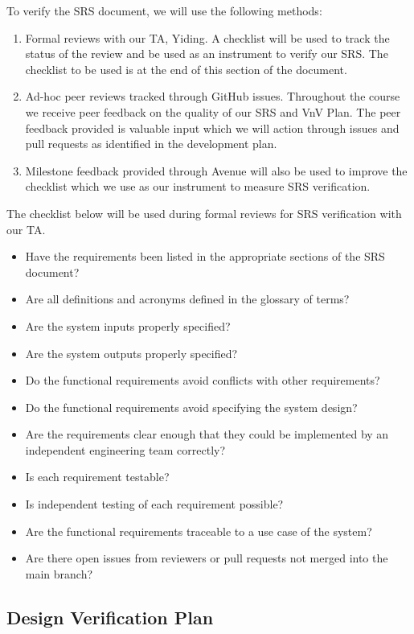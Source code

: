 \documentclass[12pt, titlepage]{article}
\begin{document}
To verify the SRS document, we will use the following methods:
\begin{enumerate}
  \item Formal reviews with our TA, Yiding. A checklist will be used to track
    the status of the review and be used as an instrument to verify our SRS.
    The checklist to be used is at the end of this section of the document.
  \item Ad-hoc peer reviews tracked through GitHub issues. Throughout the
    course we receive peer feedback on the quality of our SRS and VnV Plan. The
    peer feedback provided is valuable input which we will action through issues
    and pull requests as identified in the development plan.
  \item Milestone feedback provided through Avenue will also be used to
    improve the checklist which we use as our instrument to measure
    SRS verification.
\end{enumerate}
The checklist below will be used during formal reviews for SRS verification
with our TA.
\begin{itemize}
\item Have the requirements been listed in the appropriate sections of the
  SRS document?
\item Are all definitions and acronyms defined in the glossary of terms?
\item Are the system inputs properly specified?
\item Are the system outputs properly specified?
\item Do the functional requirements avoid conflicts with other requirements?
\item Do the functional requirements avoid specifying the system design?
\item Are the requirements clear enough that they could be implemented by an
  independent engineering team correctly?
\item Is each requirement testable?
\item Is independent testing of each requirement possible?
\item Are the functional requirements traceable to a use case of the system?
\item Are there open issues from reviewers or pull requests not merged
  into the main branch?
\end{itemize}

\subsection{Design Verification Plan}
\end{document}
